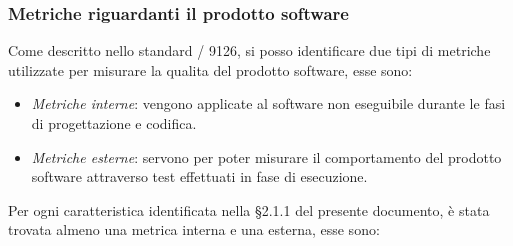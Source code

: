     \subsubsection{Metriche riguardanti il prodotto software}
    Come descritto nello standard / 9126, si posso identificare due tipi di metriche utilizzate per misurare la qualita del prodotto software, esse sono:
    \begin{itemize}
      \item \emph{Metriche interne}: vengono applicate al software non eseguibile durante le fasi di progettazione e codifica.
      \item \emph{Metriche esterne}: servono per poter misurare il comportamento del prodotto software attraverso test effettuati in fase di esecuzione.
    \end{itemize}
    Per ogni caratteristica identificata nella \S2.1.1 del presente documento, è stata trovata almeno una metrica interna e una esterna, esse sono:
